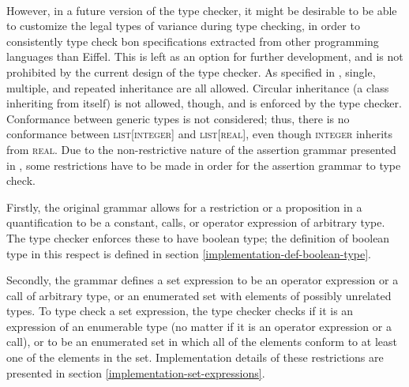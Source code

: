\paragraph{} However, in a future version of the type checker, it might be desirable to be able to customize the legal types of variance during type checking, in order to consistently type check bon specifications extracted from other programming languages than Eiffel. This is left as an option for further development, and is not prohibited by the current design of the type checker.
As specified in \cite[p.~65]{walden1995}, single, multiple, and repeated inheritance are all allowed. Circular inheritance (a class inheriting from itself) is not allowed, though, and is enforced by the type checker. Conformance between generic types is not considered; thus, there is no conformance between \textsc{list}[\textsc{integer}] and \textsc{list}[\textsc{real}], even though \textsc{integer} inherits from \textsc{real}.
Due to the non-restrictive nature of the assertion grammar presented in \cite{walden1995}, some restrictions have to be made in order for the assertion grammar to type check.

Firstly, the original grammar allows for a restriction or a proposition in a quantification to be a constant, calls, or operator expression of arbitrary type. The type checker enforces these to have boolean type; the definition of boolean type in this respect is defined in section \ref{implementation-def-boolean-type}.

Secondly,  the grammar defines a set expression to be an operator expression or a call of arbitrary type, or an enumerated set with elements of possibly unrelated types. To type check a set expression, the type checker checks if it is an expression of an enumerable type (no matter if it is an operator expression or a call), or to be an enumerated set in which all of the elements conform to at least one of the elements in the set. Implementation details of these restrictions are presented in section \ref{implementation-set-expressions}.



